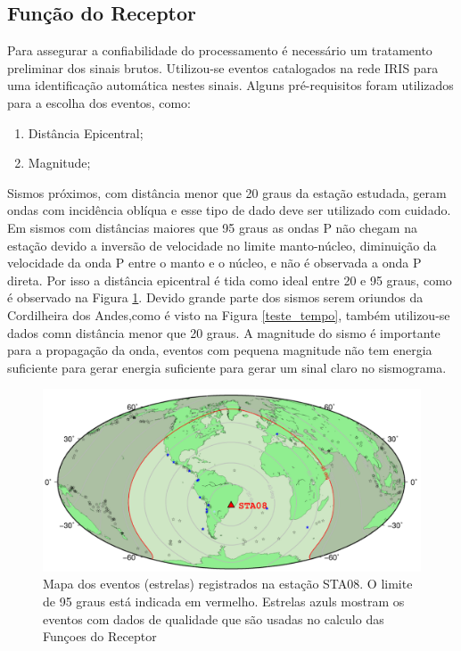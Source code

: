 \subsection{Função do Receptor}

Para assegurar a confiabilidade do processamento é necessário um tratamento preliminar dos sinais brutos. Utilizou-se eventos catalogados na rede IRIS para uma identificação automática nestes sinais. Alguns pré-requisitos foram utilizados para a escolha dos eventos, como:

\begin{enumerate}
\item Distância Epicentral;
\item Magnitude;
\end{enumerate}

Sismos próximos, com distância menor que 20 graus da estação estudada, geram ondas com incidência oblíqua e esse tipo de dado deve ser utilizado com cuidado. Em sismos com distâncias maiores que 95 graus as ondas P não chegam na estação devido a inversão de velocidade no limite manto-núcleo, diminuição da velocidade da onda P entre o manto e o núcleo, e não é observada a onda P direta. Por isso a distância epicentral é tida como ideal entre 20 e 95 graus, como é observado na Figura \ref{mapa_eventos}. Devido grande parte dos sismos serem oriundos da Cordilheira dos Andes,como é visto na Figura \ref{teste_tempo}, também utilizou-se dados comn distância menor que 20 graus. A magnitude do sismo é importante para a propagação da onda, eventos com pequena magnitude não tem energia suficiente para gerar energia suficiente para gerar um sinal claro no sismograma.

\begin{figure}[!ht]
\centering
\includegraphics[scale=0.6]{mapa_de_eventos.png}
\caption{Mapa dos eventos (estrelas) registrados na estação STA08. O limite de 95 graus está indicada em vermelho. Estrelas azuls mostram os eventos com dados de qualidade que são usadas no calculo das Funçoes do Receptor}
\label{mapa_eventos}
\end{figure}


